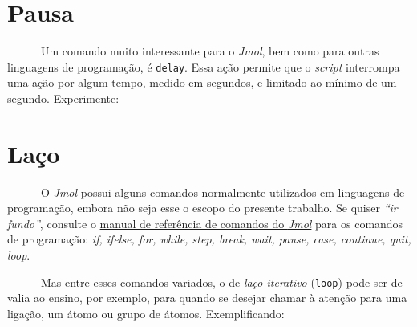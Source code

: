 \documentclass[
  letterpaper,
  DIV=11,
  numbers=noendperiod]{scrreprt}
\newenvironment{Shaded}{\begin{snugshade}}{\end{snugshade}}
\newcommand{\CommentTok}[1]{\textcolor[rgb]{0.37,0.37,0.37}{#1}}
\newcommand{\DecValTok}[1]{\textcolor[rgb]{0.68,0.00,0.00}{#1}}
\newcommand{\NormalTok}[1]{\textcolor[rgb]{0.00,0.23,0.31}{#1}}
\newcommand{\SpecialCharTok}[1]{\textcolor[rgb]{0.37,0.37,0.37}{#1}}
\begin{document}
\section{Pausa}\label{pausa}

~~~~~~Um comando muito interessante para o \emph{Jmol}, bem como para
outras linguagens de programação, é \texttt{delay}. Essa ação permite
que o \emph{script} interrompa uma ação por algum tempo, medido em
segundos, e limitado ao mínimo de um segundo. Experimente:

\begin{Shaded}
\end{Shaded}

\section{Laço}\label{lauxe7o}

~~~~~~O \emph{Jmol} possui alguns comandos normalmente utilizados em
linguagens de programação, embora não seja esse o escopo do presente
trabalho. Se quiser \emph{``ir fundo''}, consulte o
\href{https://chemapps.stolaf.edu/jmol/docs/}{manual de referência de
comandos do \emph{Jmol}} para os comandos de programação: \emph{if,
ifelse, for, while, step, break, wait, pause, case, continue, quit,
loop}.

~~~~~~Mas entre esses comandos variados, o de \emph{laço iterativo}
(\texttt{loop}) pode ser de valia ao ensino, por exemplo, para quando se
desejar chamar à atenção para uma ligação, um átomo ou grupo de átomos.
Exemplificando:

\begin{Shaded}
\end{Shaded}
\end{document}
